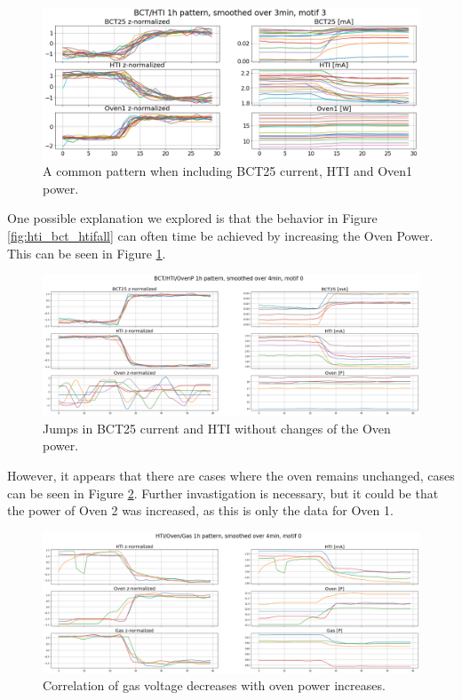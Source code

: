 \documentclass[12pt,a4paper]{article}
\begin{document}
\begin{figure}
\centering
\includegraphics[width=!,totalheight=!,scale=0.4]{images/bct_oven_hti.png}
\caption{A common pattern when including BCT25 current, HTI and Oven1 power.}
\label{fig:bct_oven_hti}
\end{figure}

One possible explanation we explored is that the behavior in Figure \ref{fig:hti_bct_htifall} can often time be achieved by increasing the Oven Power. This can be seen in Figure \ref{fig:bct_oven_hti}.

\begin{figure}
\centering
\includegraphics[width=!,totalheight=!,scale=0.4, angle=90]{images/bct_oven_hti_2dim.png}
\caption{Jumps in BCT25 current and HTI without changes of the Oven power.}
\label{fig:bct_oven_hti_2dim}
\end{figure}

However, it appears that there are cases where the oven remains unchanged, cases can be seen in Figure \ref{fig:bct_oven_hti_2dim}. Further invastigation is necessary, but it could be that the
power of Oven 2 was increased, as this is only the data for Oven 1.

\begin{figure}
\centering
\includegraphics[width=!,totalheight=!,scale=0.4, angle=90]{images/gas_oven_hti.png}
\caption{Correlation of gas voltage decreases with oven power increases.}
\label{fig:gas_oven_hti}
\end{figure}
\end{document}
